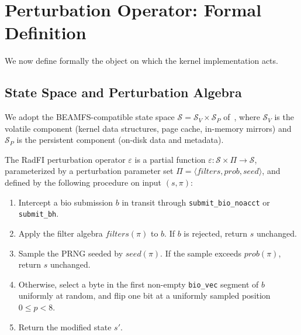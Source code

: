 \section{Perturbation Operator: Formal Definition}\label{sec:operator}

We now define formally the object on which the kernel implementation
acts.

\subsection{State Space and Perturbation Algebra}

We adopt the BEAMFS-compatible state space
\(\mathcal{S} = \mathcal{S}_V \times \mathcal{S}_P\)
of~\cite{desbrieres2026beamfsv1}, where \(\mathcal{S}_V\) is the
volatile component (kernel data structures, page cache, in-memory
mirrors) and \(\mathcal{S}_P\) is the persistent component (on-disk
data and metadata).

\begin{definition}\label{def:perturbation}
The RadFI perturbation operator \(\varepsilon\) is a partial function
\(\varepsilon : \mathcal{S} \times \Pi \to \mathcal{S}\),
parameterized by a perturbation parameter set
\(\Pi = \langle \mathit{filters}, \mathit{prob}, \mathit{seed} \rangle\),
and defined by the following procedure on input \((s, \pi)\):
\begin{enumerate}
\item Intercept a bio submission \(b\) in transit through
  \texttt{submit\_bio\_noacct} or \texttt{submit\_bh}.
\item Apply the filter algebra \(\mathit{filters}(\pi)\) to \(b\).
  If \(b\) is rejected, return \(s\) unchanged.
\item Sample the PRNG seeded by \(\mathit{seed}(\pi)\). If the
  sample exceeds \(\mathit{prob}(\pi)\), return \(s\) unchanged.
\item Otherwise, select a byte in the first non-empty
  \texttt{bio\_vec} segment of \(b\) uniformly at random, and flip
  one bit at a uniformly sampled position \(0 \leq p < 8\).
\item Return the modified state \(s'\).
\end{enumerate}
\end{definition}

